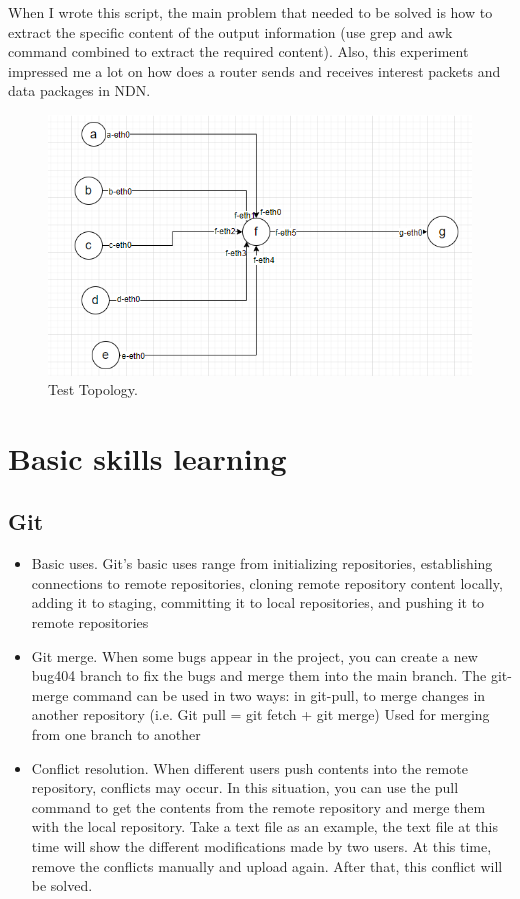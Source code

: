 \documentclass[conference]{IEEEtran}
\providecommand{\DIFaddbeginFL}{} %
\providecommand{\DIFaddendFL}{} %
\providecommand{\DIFdelbeginFL}{} %
\providecommand{\DIFdelendFL}{} %
\newcommand{\DIFscaledelfig}{0.5}
\newlength{\DIFdelgraphicswidth} %
\newlength{\DIFdelgraphicsheight} %
\newcommand{\DIFaddincludegraphics}[2][]{{\color{blue}\fbox{\DIFOincludegraphics[#1]{#2}}}} %
\newcommand{\DIFdelincludegraphics}[2][]{%
\sbox{\DIFdelgraphicsbox}{\DIFOincludegraphics[#1]{#2}}%
\settoboxwidth{\DIFdelgraphicswidth}{\DIFdelgraphicsbox} %
\settoboxtotalheight{\DIFdelgraphicsheight}{\DIFdelgraphicsbox} %
\scalebox{\DIFscaledelfig}{%
\parbox[b]{\DIFdelgraphicswidth}{\usebox{\DIFdelgraphicsbox}\\[-\baselineskip] \rule{\DIFdelgraphicswidth}{0em}}\llap{\resizebox{\DIFdelgraphicswidth}{\DIFdelgraphicsheight}{%
\setlength{\unitlength}{\DIFdelgraphicswidth}%
\begin{picture}(1,1)%
\thicklines\linethickness{2pt} %
{\color[rgb]{1,0,0}\put(0,0){\framebox(1,1){}}}%
{\color[rgb]{1,0,0}\put(0,0){\line( 1,1){1}}}%
{\color[rgb]{1,0,0}\put(0,1){\line(1,-1){1}}}%
\end{picture}%
}\hspace*{3pt}}} %
} %
\DeclareRobustCommand{\DIFaddbeginFL}{\DIFOaddbeginFL \let\includegraphics\DIFaddincludegraphics} %
\DeclareRobustCommand{\DIFaddendFL}{\DIFOaddendFL \let\includegraphics\DIFOincludegraphics} %
\DeclareRobustCommand{\DIFdelbeginFL}{\DIFOdelbeginFL \let\includegraphics\DIFdelincludegraphics} %
\DeclareRobustCommand{\DIFdelendFL}{\DIFOaddendFL \let\includegraphics\DIFOincludegraphics} %
\begin{document}
When I wrote this script, the main problem that needed to be solved is how to extract the specific content of the output information
(use grep and awk command combined to extract the required content). Also, this experiment impressed me a lot on how does a router sends and receives interest packets and data packages in NDN.
\begin{figure}[htbp]
\DIFdelbeginFL %
\DIFdelendFL \DIFaddbeginFL \centerline{\includegraphics[scale=0.57]{fig_tp.png}}
\DIFaddendFL \caption{ Test Topology.}
\label{fig_tp}
\end{figure}

\section{Basic skills learning}
\subsection{Git}
\begin{itemize}
    \item Basic uses. Git's basic uses range from initializing repositories, establishing connections to remote repositories, cloning remote repository content locally, adding it to staging, committing it to local repositories,  and pushing it to remote repositories
    \item
    Git merge. When some bugs appear in the project, you can create a new bug404 branch to fix the bugs and merge them into the main branch.
    The git-merge command can be used in two ways: in git-pull, to merge changes in another repository (i.e. Git pull = git fetch + git merge)
    Used for merging from one branch to another
    \item
    Conflict resolution. When different users push contents into the remote repository, conflicts may occur. In this situation, you can use the pull command to get the contents from the remote repository and merge them with the local repository. Take a text file as an example, the text file at this time will show the different modifications made by two users. At this time, remove the conflicts manually and upload again. After that, this conflict will be solved. 
\end{itemize}
\end{document}
